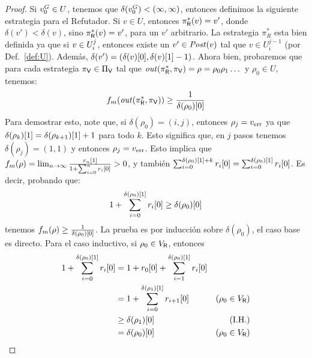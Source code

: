 \begin{proof}
	Si $\InitVertex^G \in U$, tenemos que $\delta(\InitVertex^G) < (\infty, \infty)$, entonces definimos la siguiente estrategia para el Refutador. 
	Si $v \in U$, entonces $\pi^*_\Refuter(v)= v'$, donde $\delta(v') < \delta(v)$, sino $\pi^*_\Refuter(v)=v'$, para un $v'$ arbitrario. 
	La estrategia $\pi^*_R$ esta bien definida ya que si $v \in \setsUs$, entonces existe un $v' \in \post(v)$ tal que $v \in U^{j-1}_i$ (por Def.~\ref{def:U}). Además, $\delta(v') = (\pr{0}{\delta(v)}, \pr{1}{\delta(v)} - 1)$.  
	Ahora bien, probaremos que para cada estrategia $\pi_\Verifier \in \Pi_\Verifier$ tal que $\out(\pi^*_\Refuter, \pi_\Verifier) = \rho = \rho_0 \rho_1 \dots$ y $\rho_0 \in U$, tenemos:
\begin{equation}\label{eq:inf-bound}
	\FMask(\out(\pi^*_\Refuter, \pi_\Verifier)) \geq \frac{1}{ \pr{0}{\delta(\rho_0)}}
\end{equation} 
		Para demostrar esto, note que, si $\delta(\rho_0)= (i,j)$, entonces $\rho_j =\ErrorSt$ 
		ya que $\pr{1}{\delta(\rho_k)} = \pr{1}{\delta(\rho_{k+1})}+1$ para todo $k$. 
Esto significa que, en $j$ pasos tenemos $\delta(\rho_{j}) = (1,1)$ y entonces $\rho_{j} = \ErrorSt$.
	Esto implica que $\FMask(\rho) =  \lim_{n \rightarrow \infty}  \frac{\pr{1}{r_n}}{1+ \sum^{n}_{i=0} \pr{0}{r_i}} >0$, y también
$ \sum^{\pr{1}{\delta(\rho_0)} + k}_{i=0} \pr{0}{r_i} =  \sum^{\pr{1}{\delta(\rho_0)}}_{i=0} \pr{0}{r_i}$.
	 Es decir, probando que:
\begin{equation}\label{eq:bottom-sum}
 1+ \sum^{\pr{1}{\delta(\rho_0)}}_{i=0} \pr{0}{r_i} \geq \pr{0}{\delta(\rho_0)}
\end{equation} 
tenemos $\FMask(\rho) \geq \frac{1}{ \pr{0}{\delta(\rho_0)}}$. La prueba es por inducción sobre $\delta(\rho_0)$, el caso base es directo.
 Para el caso inductivo, si $\rho_0 \in V_\Refuter$, entonces
\begin{align*}
 	1 + \sum^{\pr{1}{\delta(\rho_0)}}_{i=0} \pr{0}{r_i} & =  1 + \pr{0}{r_0} + \sum^{\pr{1}{\delta(\rho_0)}}_{i=1} \pr{0}{r_i} & \\
					     & =   1+ \sum^{\pr{1}{\delta(\rho_1)}}_{i=0} \pr{0}{r_{i+1}} &  \text{($\rho_0 \in V_\Refuter$)}\\
					     & \geq \pr{0}{\delta(\rho_1)} & \text{(I.H.)} \\
					     & = \pr{0}{\delta(\rho_0)} & \text{($\rho_0 \in V_\Refuter$)}

\end{align*}
\end{proof}
